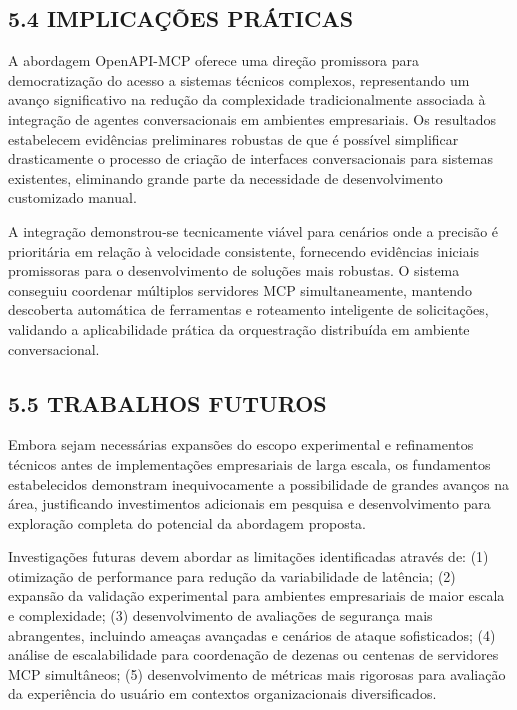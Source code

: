 \documentclass[
]{article}
\begin{document}
\subsection{5.4 IMPLICAÇÕES
PRÁTICAS}\label{implicauxe7uxf5es-pruxe1ticas}

A abordagem OpenAPI-MCP oferece uma direção promissora para
democratização do acesso a sistemas técnicos complexos, representando um
avanço significativo na redução da complexidade tradicionalmente
associada à integração de agentes conversacionais em ambientes
empresariais. Os resultados estabelecem evidências preliminares robustas
de que é possível simplificar drasticamente o processo de criação de
interfaces conversacionais para sistemas existentes, eliminando grande
parte da necessidade de desenvolvimento customizado manual.

A integração demonstrou-se tecnicamente viável para cenários onde a
precisão é prioritária em relação à velocidade consistente, fornecendo
evidências iniciais promissoras para o desenvolvimento de soluções mais
robustas. O sistema conseguiu coordenar múltiplos servidores MCP
simultaneamente, mantendo descoberta automática de ferramentas e
roteamento inteligente de solicitações, validando a aplicabilidade
prática da orquestração distribuída em ambiente conversacional.

\subsection{5.5 TRABALHOS FUTUROS}\label{trabalhos-futuros}

Embora sejam necessárias expansões do escopo experimental e refinamentos
técnicos antes de implementações empresariais de larga escala, os
fundamentos estabelecidos demonstram inequivocamente a possibilidade de
grandes avanços na área, justificando investimentos adicionais em
pesquisa e desenvolvimento para exploração completa do potencial da
abordagem proposta.

Investigações futuras devem abordar as limitações identificadas através
de: (1) otimização de performance para redução da variabilidade de
latência; (2) expansão da validação experimental para ambientes
empresariais de maior escala e complexidade; (3) desenvolvimento de
avaliações de segurança mais abrangentes, incluindo ameaças avançadas e
cenários de ataque sofisticados; (4) análise de escalabilidade para
coordenação de dezenas ou centenas de servidores MCP simultâneos; (5)
desenvolvimento de métricas mais rigorosas para avaliação da experiência
do usuário em contextos organizacionais diversificados.
\end{document}
